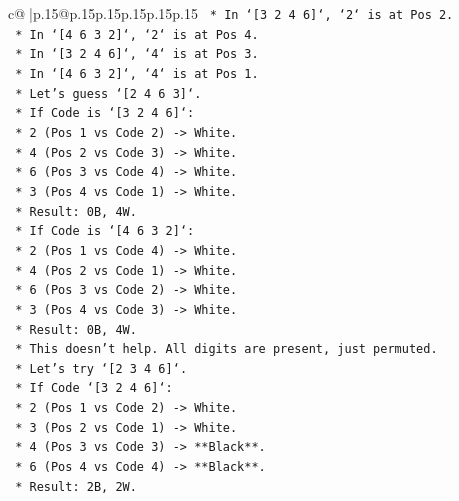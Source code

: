 \documentclass{article}
\begin{document}
{\begin{supertabular}{c@{$\;$}|p{.15\linewidth}@{}p{.15\linewidth}p{.15\linewidth}p{.15\linewidth}p{.15\linewidth}p{.15\linewidth}}
{{{\texttt{            *   In `{[}3 2 4 6{]}`, `2` is at Pos 2.} \\
\texttt{            *   In `{[}4 6 3 2{]}`, `2` is at Pos 4.} \\
\texttt{            *   In `{[}3 2 4 6{]}`, `4` is at Pos 3.} \\
\texttt{            *   In `{[}4 6 3 2{]}`, `4` is at Pos 1.} \\
\texttt{            *   Let's guess `{[}2 4 6 3{]}`.} \\
\texttt{                *   If Code is `{[}3 2 4 6{]}`:} \\
\texttt{                    *   2 (Pos 1 vs Code 2) {-}> White.} \\
\texttt{                    *   4 (Pos 2 vs Code 3) {-}> White.} \\
\texttt{                    *   6 (Pos 3 vs Code 4) {-}> White.} \\
\texttt{                    *   3 (Pos 4 vs Code 1) {-}> White.} \\
\texttt{                    *   Result: 0B, 4W.} \\
\texttt{                *   If Code is `{[}4 6 3 2{]}`:} \\
\texttt{                    *   2 (Pos 1 vs Code 4) {-}> White.} \\
\texttt{                    *   4 (Pos 2 vs Code 1) {-}> White.} \\
\texttt{                    *   6 (Pos 3 vs Code 2) {-}> White.} \\
\texttt{                    *   3 (Pos 4 vs Code 3) {-}> White.} \\
\texttt{                    *   Result: 0B, 4W.} \\
\texttt{                *   This doesn't help. All digits are present, just permuted.} \\
\texttt{            *   Let's try `{[}2 3 4 6{]}`.} \\
\texttt{                *   If Code `{[}3 2 4 6{]}`:} \\
\texttt{                    *   2 (Pos 1 vs Code 2) {-}> White.} \\
\texttt{                    *   3 (Pos 2 vs Code 1) {-}> White.} \\
\texttt{                    *   4 (Pos 3 vs Code 3) {-}> **Black**.} \\
\texttt{                    *   6 (Pos 4 vs Code 4) {-}> **Black**.} \\
\texttt{                    *   Result: 2B, 2W.} \\
}}}
\end{supertabular}}
\end{document}
